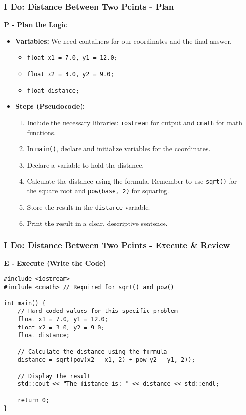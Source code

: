 \documentclass{beamer}
\begin{document}
\begin{frame}
\frametitle{I Do: Distance Between Two Points - Plan}
\textbf{P - Plan the Logic}
\begin{itemize}
    \item \textbf{Variables:} We need containers for our coordinates and the final answer.
    \begin{itemize}
        \item \texttt{float x1 = 7.0, y1 = 12.0;}
        \item \texttt{float x2 = 3.0, y2 = 9.0;}
        \item \texttt{float distance;}
    \end{itemize}
    \item \textbf{Steps (Pseudocode):}
    \begin{enumerate}
        \item Include the necessary libraries: \texttt{iostream} for output and \texttt{cmath} for math functions.
        \item In \texttt{main()}, declare and initialize variables for the coordinates.
        \item Declare a variable to hold the distance.
        \item Calculate the distance using the formula. Remember to use \texttt{sqrt()} for the square root and \texttt{pow(base, 2)} for squaring.
        \item Store the result in the \texttt{distance} variable.
        \item Print the result in a clear, descriptive sentence.
    \end{enumerate}
\end{itemize}
\end{frame}

\begin{frame}[fragile]
\frametitle{I Do: Distance Between Two Points - Execute \& Review}
\textbf{E - Execute (Write the Code)}
\begin{verbatim}
#include <iostream>
#include <cmath> // Required for sqrt() and pow()

int main() {
    // Hard-coded values for this specific problem
    float x1 = 7.0, y1 = 12.0;
    float x2 = 3.0, y2 = 9.0;
    float distance;

    // Calculate the distance using the formula
    distance = sqrt(pow(x2 - x1, 2) + pow(y2 - y1, 2));

    // Display the result
    std::cout << "The distance is: " << distance << std::endl;

    return 0;
}
\end{verbatim}
\end{frame}
\end{document}
